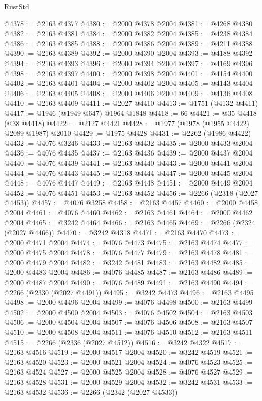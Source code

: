 \begin{lexlean}{RustStd}
\begin{coremodule}
@4378 := @2163 @4377
@4380 := @2000 @4378 @2004
@4381 := @4268 @4380
@4382 := @2163 @4381
@4384 := @2000 @4382 @2004
@4385 := @4238 @4384
@4386 := @2163 @4385
@4388 := @2000 @4386 @2004
@4389 := @4211 @4388
@4390 := @2163 @4389
@4392 := @2000 @4390 @2004
@4393 := @4188 @4392
@4394 := @2163 @4393
@4396 := @2000 @4394 @2004
@4397 := @4169 @4396
@4398 := @2163 @4397
@4400 := @2000 @4398 @2004
@4401 := @4154 @4400
@4402 := @2163 @4401
@4404 := @2000 @4402 @2004
@4405 := @4143 @4404
@4406 := @2163 @4405
@4408 := @2000 @4406 @2004
@4409 := @4136 @4408
@4410 := @2163 @4409
@4411 := @2027 @4410
@4413 := @1751 (@4132 @4411)
@4417 := @1946 (@1949 @647) @1964 @1848
@4418 := 66
@4421 := @35 @4418 (@38 @4418)
@4422 := @2127 @4421
@4428 := @1977 (@1978 (@1955 @4422) @2089 @1987) @2010
@4429 := @1975 @4428
@4431 := @2262 (@1986 @4422)
@4432 := @4076 @3246
@4433 := @2163 @4432
@4435 := @2000 @4433 @2004
@4436 := @4076 @4435
@4437 := @2163 @4436
@4439 := @2000 @4437 @2004
@4440 := @4076 @4439
@4441 := @2163 @4440
@4443 := @2000 @4441 @2004
@4444 := @4076 @4443
@4445 := @2163 @4444
@4447 := @2000 @4445 @2004
@4448 := @4076 @4447
@4449 := @2163 @4448
@4451 := @2000 @4449 @2004
@4452 := @4076 @4451
@4453 := @2163 @4452
@4456 := @2266 (@2318 (@2027 @4453))
@4457 := @4076 @3258
@4458 := @2163 @4457
@4460 := @2000 @4458 @2004
@4461 := @4076 @4460
@4462 := @2163 @4461
@4464 := @2000 @4462 @2004
@4465 := @3242 @4464
@4466 := @2163 @4465
@4469 := @2266 (@2324 (@2027 @4466))
@4470 := @3242 @4318
@4471 := @2163 @4470
@4473 := @2000 @4471 @2004
@4474 := @4076 @4473
@4475 := @2163 @4474
@4477 := @2000 @4475 @2004
@4478 := @4076 @4477
@4479 := @2163 @4478
@4481 := @2000 @4479 @2004
@4482 := @3242 @4481
@4483 := @2163 @4482
@4485 := @2000 @4483 @2004
@4486 := @4076 @4485
@4487 := @2163 @4486
@4489 := @2000 @4487 @2004
@4490 := @4076 @4489
@4491 := @2163 @4490
@4494 := @2266 (@2330 (@2027 @4491))
@4495 := @3242 @4473
@4496 := @2163 @4495
@4498 := @2000 @4496 @2004
@4499 := @4076 @4498
@4500 := @2163 @4499
@4502 := @2000 @4500 @2004
@4503 := @4076 @4502
@4504 := @2163 @4503
@4506 := @2000 @4504 @2004
@4507 := @4076 @4506
@4508 := @2163 @4507
@4510 := @2000 @4508 @2004
@4511 := @4076 @4510
@4512 := @2163 @4511
@4515 := @2266 (@2336 (@2027 @4512))
@4516 := @3242 @4322
@4517 := @2163 @4516
@4519 := @2000 @4517 @2004
@4520 := @3242 @4519
@4521 := @2163 @4520
@4523 := @2000 @4521 @2004
@4524 := @4076 @4523
@4525 := @2163 @4524
@4527 := @2000 @4525 @2004
@4528 := @4076 @4527
@4529 := @2163 @4528
@4531 := @2000 @4529 @2004
@4532 := @3242 @4531
@4533 := @2163 @4532
@4536 := @2266 (@2342 (@2027 @4533))

\end{coremodule}
\end{lexlean}
